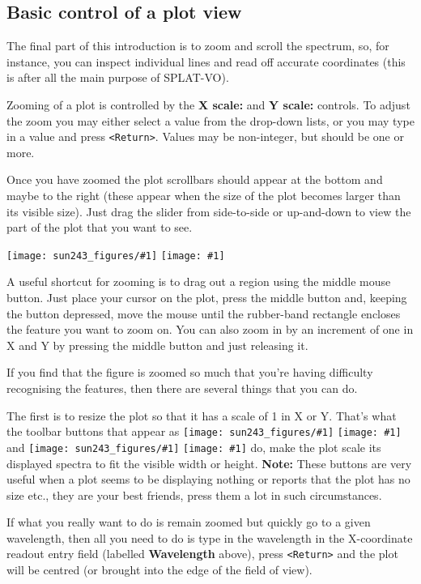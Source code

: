 \documentclass[twoside,11pt,nolof]{starlink}
\providecommand{\SPLAT}{\textsf{SPLAT-VO}}
\providecommand{\mainfigure}[1]
{\begin{center}
    \ifpdf
    \texttt{[image: sun243\_figures/\#1]}
    \else
    \texttt{[image: \#1]}
    \fi
 \end{center}
}
\providecommand{\inline}[1]
        {\ifpdf
          \texttt{[image: sun243\_figures/\#1]}
          \else
          \texttt{[image: \#1]}
          \fi
        }
\newcommand{\labelitem}[1]{\textbf{#1}}
\providecommand{\hitext}[1]{\texttt{#1}}
\begin{document}
\newpage
\subsection{Basic control of a plot view}

The final part of this introduction is to zoom and scroll the
spectrum, so, for instance, you can inspect individual lines and read
off accurate coordinates (this is after all the main purpose of
\SPLAT).

Zooming of a plot is controlled by the \labelitem{X scale:} and
\labelitem{Y scale:} controls. To adjust the zoom you may either select a
value from the drop-down lists, or you may type in a value and press
\hitext{<Return>}. Values may be non-integer, but should be one or more.

Once you have zoomed the plot scrollbars should appear at the bottom
and maybe to the right (these appear when the size of the plot becomes
larger than its visible size). Just drag the slider from side-to-side
or up-and-down to view the part of the plot that you want to see.

\mainfigure{plot4}

A useful shortcut for zooming is to drag out a region using the middle
mouse button. Just place your cursor on the plot, press the middle
button and, keeping the button depressed, move the mouse until the
rubber-band rectangle encloses the feature you want to zoom on. You
can also zoom in by an increment of one in X and Y by pressing the
middle button and just releasing it.

If you find that the figure is zoomed so much that you're having
difficulty recognising the features, then there are several things
that you can do.

The first is to resize the plot so that it has a scale of 1 in X or
Y. That's what the toolbar buttons that appear as
\inline{fitwidth} and \inline{fitheight} do, make the plot scale its
displayed spectra to fit the visible width or height.
\textbf{Note:} These buttons are very useful when a plot seems to be
displaying nothing or reports that the plot has no size etc., they are your
best friends, press them a lot in such circumstances.

If what you really want to do is remain zoomed but quickly go to a
given wavelength, then all you need to do is type in the wavelength in
the X-coordinate readout entry field (labelled \labelitem{Wavelength}
above), press \hitext{<Return>} and the plot will be centred (or
brought into the edge of the field of view).
\end{document}

